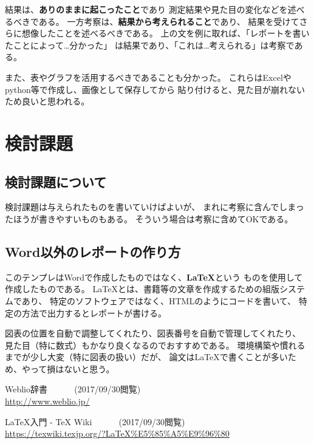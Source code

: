 \documentclass[autodetect-engine,dvipdfmx-if-dvi,ja=standard]{bxjsarticle}
\newcommand{\web}[3]{
    #1
    ~~~~~
    (#2閲覧) \\
    \url{#3}
}
\begin{document}
結果は、\textbf{ありのままに起こったこと}であり
測定結果や見た目の変化などを述べるべきである。
一方考察は、\textbf{結果から考えられること}であり、
結果を受けてさらに想像したことを述べるべきである。
上の文を例に取れば、「レポートを書いたことによって…分かった」
は結果であり、「これは…考えられる」は考察である。

また、表やグラフを活用するべきであることも分かった。
これらはExcelやpython等で作成し、画像として保存してから
貼り付けると、見た目が崩れないため良いと思われる。



\section{検討課題}
\subsection{検討課題について}
検討課題は与えられたものを書いていけばよいが、
まれに考察に含んでしまったほうが書きやすいものもある。
そういう場合は考察に含めてOKである。

\subsection{Word以外のレポートの作り方}
このテンプレはWordで作成したものではなく、\textbf{LaTeX}という
ものを使用して作成したものである。
LaTeXとは、書籍等の文章を作成するための組版システムであり、
特定のソフトウェアではなく、HTMLのようにコードを書いて、
特定の方法で出力するとレポートが書ける。
\cite{LaTeX}

図表の位置を自動で調整してくれたり、図表番号を自動で管理してくれたり、
見た目（特に数式）もかなり良くなるのでおすすめである。
環境構築や慣れるまでが少し大変（特に図表の扱い）だが、
論文はLaTeXで書くことが多いため、やって損はないと思う。


\begin{thebibliography}{99}
 \web{Weblio辞書}{2017/09/30}{http://www.weblio.jp/}
 \web{LaTeX入門 - TeX Wiki}{2017/09/30}{https://texwiki.texjp.org/?LaTeX\%E5\%85\%A5\%E9\%96\%80}
\end{thebibliography}
\end{document}
